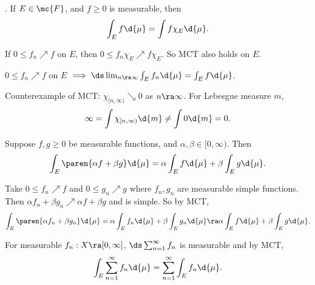 . If \(E \in \mc{F}\), and \(f \geq 0\) is measurable, then
\[
    \int_E f \d{\mu} = \int f \chi_{E} \d{\mu}.
\]

\rmk If \(0 \leq f_n \nearrow f\) on \(E\), then \(0\leq f_n \chi_E \nearrow f \chi_E\). So MCT also holds on \(E\).
\begin{center}
    \(0\leq f_n \nearrow f\) on \(E\) \(\implies \ds \lim_{n\ra\infty} \int_E f_n \d{\mu} = \int_E f \d{\mu}\).
\end{center}

\rmk Counterexample of MCT: \(\chi_{[n, \infty)} \searrow 0\) as \(n \ra \infty\). For Lebesgue measure \(m\),
\[
    \infty = \int \chi_{[n, \infty)} \d{m} \neq \int 0 \d{m} = 0.
\]

\rmk Suppose \(f, g \geq 0\) be measurable functions, and \(\alpha, \beta \in [0, \infty)\). Then
\[
    \int_E \paren{\alpha f + \beta g} \d{\mu} = \alpha \int_E f \d{\mu} + \beta \int_E g\d{\mu}.
\]

\pf Take \(0 \leq f_n \nearrow f\) and \(0 \leq g_n\nearrow g\) where \(f_n, g_n\) are measurable simple functions. Then \(\alpha f_n + \beta g_n \nearrow \alpha f + \beta g\) and is simple. So by MCT,
\[
    \int_E \paren{\alpha f_n + \beta g_n} \d{\mu} = \alpha \int_E f_n \d{\mu} + \beta \int_E g_n \d{\mu} \ra \alpha \int_E f \d{\mu} + \beta \int_E g\d{\mu}.
\]

 For measurable \(f_n: X \ra [0, \infty]\), \(\ds \sum_{n=1}^\infty f_n\) is measurable and by MCT,
\[
    \int_E \sum_{n=1}^\infty f_n \d{\mu} = \sum_{n=1}^\infty \int_E f_n \d{\mu}.
\]

\pagebreak
